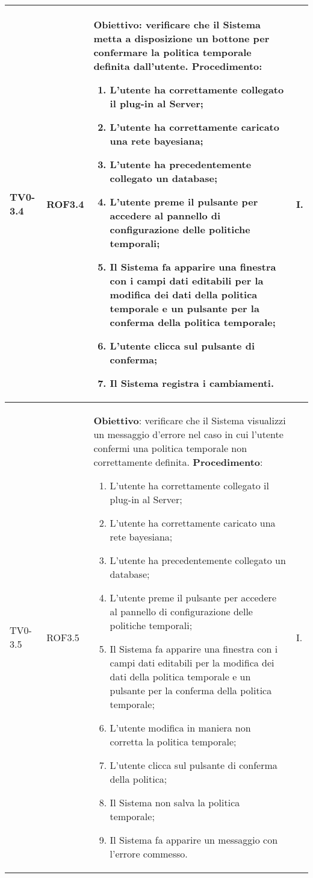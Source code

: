 \begin{longtable}{|C{.15\textwidth}|C{.13\textwidth}|m{.52\textwidth}|C{.08\textwidth}|}
TV0-3.4 & ROF3.4 &
	\textbf{Obiettivo}: verificare che il Sistema metta a disposizione un bottone per confermare la politica temporale definita dall'utente. \newline
	\textbf{Procedimento}:
	\begin{enumerate}
		\item L'utente ha correttamente collegato il plug-in al Server;
		\item L'utente ha correttamente caricato una rete bayesiana;
		\item L'utente ha precedentemente collegato un database;
		\item L'utente preme il pulsante per accedere al pannello di configurazione delle politiche temporali;
		\item Il Sistema fa apparire una finestra con i campi dati editabili per la modifica dei dati della politica temporale e un pulsante per la conferma della politica temporale;
		\item L'utente clicca sul pulsante di conferma;
		\item Il Sistema registra i cambiamenti.
	\end{enumerate}
	& I. \\
\hline

TV0-3.5 & ROF3.5 &
	\textbf{Obiettivo}: verificare che il Sistema visualizzi un messaggio d'errore nel caso in cui l'utente confermi una politica temporale non correttamente definita. \newline
	\textbf{Procedimento}:
	\begin{enumerate}
		\item L'utente ha correttamente collegato il plug-in al Server;
		\item L'utente ha correttamente caricato una rete bayesiana;
		\item L'utente ha precedentemente collegato un database;
		\item L'utente preme il pulsante per accedere al pannello di configurazione delle politiche temporali;
		\item Il Sistema fa apparire una finestra con i campi dati editabili per la modifica dei dati della politica temporale e un pulsante per la conferma della politica temporale;
		\item L'utente modifica in maniera non corretta la politica temporale;
		\item L'utente clicca sul pulsante di conferma della politica;
		\item Il Sistema non salva la politica temporale;
		\item Il Sistema fa apparire un messaggio con l'errore commesso.
	\end{enumerate}
	& I. \\
\hline


\end{longtable}
